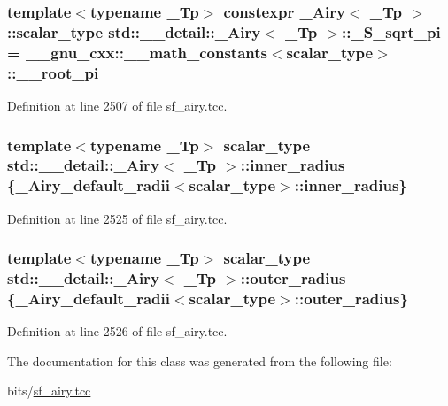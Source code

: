 \subsubsection[{\texorpdfstring{\+\_\+\+S\+\_\+sqrt\+\_\+pi}{_S_sqrt_pi}}]{\setlength{\rightskip}{0pt plus 5cm}template$<$typename \+\_\+\+Tp$>$ constexpr {\bf \+\_\+\+Airy}$<$ \+\_\+\+Tp $>$\+::{\bf scalar\+\_\+type} {\bf std\+::\+\_\+\+\_\+detail\+::\+\_\+\+Airy}$<$ \+\_\+\+Tp $>$\+::\+\_\+\+S\+\_\+sqrt\+\_\+pi = \+\_\+\+\_\+gnu\+\_\+cxx\+::\+\_\+\+\_\+math\+\_\+constants$<${\bf scalar\+\_\+type}$>$\+::\+\_\+\+\_\+root\+\_\+pi\hspace{0.3cm}{\ttfamily [static]}}\hypertarget{classstd_1_1____detail_1_1__Airy_abee18aba33b66386e818da9c7f4eeff4}{}\label{classstd_1_1____detail_1_1__Airy_abee18aba33b66386e818da9c7f4eeff4}


Definition at line 2507 of file sf\+\_\+airy.\+tcc.

\subsubsection[{\texorpdfstring{inner\+\_\+radius}{inner_radius}}]{\setlength{\rightskip}{0pt plus 5cm}template$<$typename \+\_\+\+Tp$>$ {\bf scalar\+\_\+type} {\bf std\+::\+\_\+\+\_\+detail\+::\+\_\+\+Airy}$<$ \+\_\+\+Tp $>$\+::inner\+\_\+radius \{{\bf \+\_\+\+Airy\+\_\+default\+\_\+radii}$<${\bf scalar\+\_\+type}$>$\+::inner\+\_\+radius\}}\hypertarget{classstd_1_1____detail_1_1__Airy_ae619970f4c54b7f80340f05b7ead83e1}{}\label{classstd_1_1____detail_1_1__Airy_ae619970f4c54b7f80340f05b7ead83e1}


Definition at line 2525 of file sf\+\_\+airy.\+tcc.

\subsubsection[{\texorpdfstring{outer\+\_\+radius}{outer_radius}}]{\setlength{\rightskip}{0pt plus 5cm}template$<$typename \+\_\+\+Tp$>$ {\bf scalar\+\_\+type} {\bf std\+::\+\_\+\+\_\+detail\+::\+\_\+\+Airy}$<$ \+\_\+\+Tp $>$\+::outer\+\_\+radius \{{\bf \+\_\+\+Airy\+\_\+default\+\_\+radii}$<${\bf scalar\+\_\+type}$>$\+::outer\+\_\+radius\}}\hypertarget{classstd_1_1____detail_1_1__Airy_af688e5d14ed305f95f0e9d9d58d3bf9a}{}\label{classstd_1_1____detail_1_1__Airy_af688e5d14ed305f95f0e9d9d58d3bf9a}


Definition at line 2526 of file sf\+\_\+airy.\+tcc.



The documentation for this class was generated from the following file\+:\begin{DoxyCompactItemize}
\item 
bits/\hyperlink{sf__airy_8tcc}{sf\+\_\+airy.\+tcc}\end{DoxyCompactItemize}
